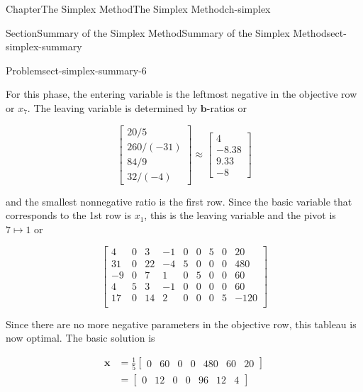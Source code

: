 \documentclass[oneside,10pt,]{book}
\numberwithin{equation}{section}
\newcommand{\amp}{&}
\begin{document}
\begin{chapterptx}{Chapter}{The Simplex Method}{}{The Simplex Method}{}{}{ch-simplex}
\begin{sectionptx}{Section}{Summary of the Simplex Method}{}{Summary of the Simplex Method}{}{}{sect-simplex-summary}
\begin{problem}{Problem}{}{sect-simplex-summary-6}
\par
For this phase, the entering variable is the leftmost negative in the objective row or \(x_7\). The leaving variable is determined by \(\boldsymbol{b}\)-ratios or%
\par
%
\begin{equation*}
\begin{bmatrix} 20/5 \\ 260/(-31) \\ 84/9 \\ 32/(-4) \end{bmatrix} \approx \begin{bmatrix} 4 \\ -8.38  \\ 9.33 \\ -8 \end{bmatrix}
\end{equation*}
%
\par
and the smallest nonnegative ratio is the first row. Since the basic variable that corresponds to the 1st row is \(x_1\), this is the leaving variable and the pivot is \(7 \mapsto 1\) or%
\par
%
\begin{equation*}
\left[\begin{array}{rrr|rrrrr|r} 4 \amp 0 \amp 3 \amp -1 \amp 0 \amp 0 \amp 5 \amp 0 \amp 20\\ 31 \amp 0 \amp 22 \amp -4 \amp 5 \amp 0 \amp 0 \amp 0 \amp 480\\ -9 \amp 0 \amp 7 \amp 1 \amp 0 \amp 5 \amp 0 \amp 0 \amp 60\\ 4 \amp 5 \amp 3 \amp -1 \amp 0 \amp 0 \amp 0 \amp 0 \amp 60\\ \hline 17 \amp 0 \amp 14 \amp 2 \amp 0 \amp 0 \amp 0 \amp 5 \amp -120\\ \end{array} \right]
\end{equation*}
%
\par
Since there are no more negative parameters in the objective row, this tableau is now optimal. The basic solution is%
\par
%
\begin{align*}
\boldsymbol{x} \amp = \frac{1}{5}\left[\begin{array}{rrr|rrrr} 0 \amp 60 \amp 0 \amp 0 \amp 480 \amp 60 \amp 20 \end{array}\right] \\
\amp = \left[\begin{array}{rrr|rrrr} 0 \amp 12 \amp 0 \amp 0 \amp 96 \amp 12 \amp 4 \end{array}\right]

\end{align*}
\end{problem}
\end{sectionptx}
\end{chapterptx}
\end{document}
